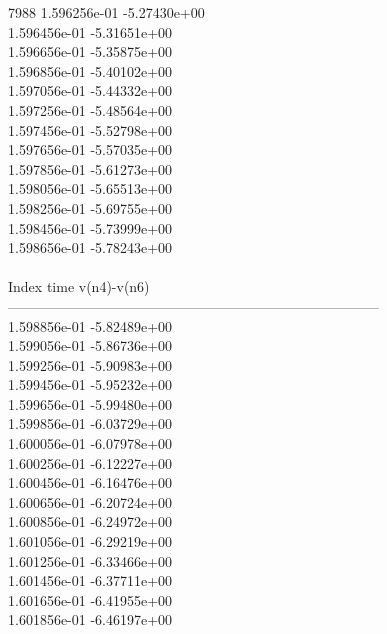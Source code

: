 7988	1.596256e-01	-5.27430e+00	\\ 	1.596456e-01	-5.31651e+00	\\ 	1.596656e-01	-5.35875e+00	\\ 	1.596856e-01	-5.40102e+00	\\ 	1.597056e-01	-5.44332e+00	\\ 	1.597256e-01	-5.48564e+00	\\ 	1.597456e-01	-5.52798e+00	\\ 	1.597656e-01	-5.57035e+00	\\ 	1.597856e-01	-5.61273e+00	\\ 	1.598056e-01	-5.65513e+00	\\ 	1.598256e-01	-5.69755e+00	\\ 	1.598456e-01	-5.73999e+00	\\ 	1.598656e-01	-5.78243e+00	\\ \hline
\\ \hline
Index   time            v(n4)-v(n6)     \\ \hline
--------------------------------------------------------------------------------\\ 	1.598856e-01	-5.82489e+00	\\ 	1.599056e-01	-5.86736e+00	\\ 	1.599256e-01	-5.90983e+00	\\ 	1.599456e-01	-5.95232e+00	\\ 	1.599656e-01	-5.99480e+00	\\ 	1.599856e-01	-6.03729e+00	\\ 	1.600056e-01	-6.07978e+00	\\ 	1.600256e-01	-6.12227e+00	\\ 	1.600456e-01	-6.16476e+00	\\ 	1.600656e-01	-6.20724e+00	\\ 	1.600856e-01	-6.24972e+00	\\ 	1.601056e-01	-6.29219e+00	\\ 	1.601256e-01	-6.33466e+00	\\ 	1.601456e-01	-6.37711e+00	\\ 	1.601656e-01	-6.41955e+00	\\ 	1.601856e-01	-6.46197e+00	\\ \hline
